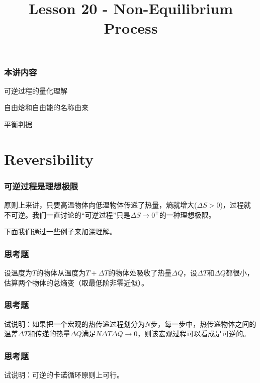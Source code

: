 \documentclass[CJK,14pt]{beamer}
\title{Lesson 20 - Non-Equilibrium Process}
\author{}
\date{}
\begin{document}
\bch
  

\begin{frame}
\frametitle{本讲内容}

\bitem
\item{可逆过程的量化理解}
\item{自由焓和自由能的名称由来}  
\item{平衡判据}
\eitem

\end{frame}


\section{Reversibility}



\begin{frame}
  \frametitle{可逆过程是理想极限}

  原则上来讲，只要高温物体向低温物体传递了热量，熵就增大($\Delta S>0$)，过程就不可逆。我们一直讨论的“可逆过程”只是$\Delta S\rightarrow 0^+$的一种理想极限。

  
  下面我们通过一些例子来加深理解。
  

\end{frame}


\begin{frame}
  \frametitle{思考题}

  
  设温度为$T$的物体从温度为$T+\Delta T$的物体处吸收了热量$\Delta Q$，设$\Delta T$和$\Delta Q$都很小，估算两个物体的总熵变（取最低阶非零近似）。
\end{frame}


\begin{frame}
\frametitle{思考题}
\bch


试说明：如果把一个宏观的热传递过程划分为$N$步，每一步中，热传递物体之间的温差$\Delta T$和传递的热量$\Delta Q$满足$N\Delta T\Delta Q \rightarrow 0$，则该宏观过程可以看成是可逆的。

\ech
\end{frame}


\begin{frame}
\frametitle{思考题}



试说明：可逆的卡诺循环原则上可行。


\end{frame}
\end{document}
